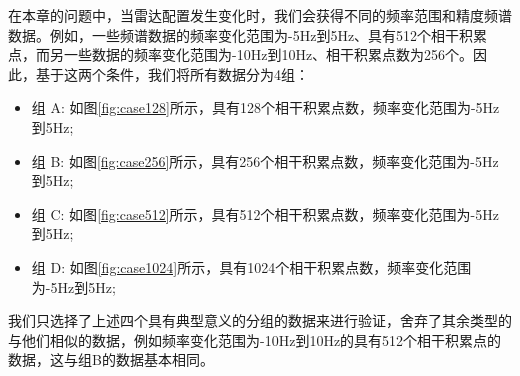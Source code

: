 在本章的问题中，当雷达配置发生变化时，我们会获得不同的频率范围和精度频谱数据。例如，一些频谱数据的频率变化范围为-5Hz到5Hz、具有512个相干积累点，而另一些数据的频率变化范围为-10Hz到10Hz、相干积累点数为256个。因此，基于这两个条件，我们将所有数据分为4组：
\begin{itemize}
	\item 组 A: 如图\ref{fig:case128}所示，具有128个相干积累点数，频率变化范围为-5Hz到5Hz;
	\item 组 B: 如图\ref{fig:case256}所示，具有256个相干积累点数，频率变化范围为-5Hz到5Hz;
	\item 组 C: 如图\ref{fig:case512}所示，具有512个相干积累点数，频率变化范围为-5Hz到5Hz;
	\item 组 D: 如图\ref{fig:case1024}所示，具有1024个相干积累点数，频率变化范围为-5Hz到5Hz;
\end{itemize}
我们只选择了上述四个具有典型意义的分组的数据来进行验证，舍弃了其余类型的与他们相似的数据，例如频率变化范围为-10Hz到10Hz的具有512个相干积累点的数据，这与组B的数据基本相同。
